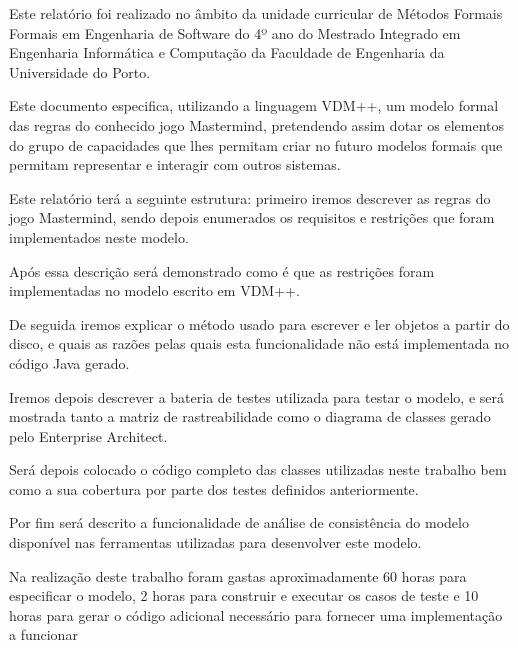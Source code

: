 Este relatório foi realizado no âmbito da unidade curricular de
Métodos Formais Formais em Engenharia de Software do 4º ano do
Mestrado Integrado em Engenharia Informática e Computação da Faculdade
de Engenharia da Universidade do Porto.

Este documento especifica, utilizando a linguagem VDM++, um modelo
formal das regras do conhecido jogo Mastermind, pretendendo assim
dotar os elementos do grupo de capacidades que lhes permitam criar no
futuro modelos formais que permitam representar e interagir com outros
sistemas.

Este relatório terá a seguinte estrutura: primeiro iremos descrever as
regras do jogo Mastermind, sendo depois enumerados os requisitos e
restrições que foram implementados neste modelo.

Após essa descrição será demonstrado como é que as restrições foram
implementadas no modelo escrito em VDM++.

De seguida iremos explicar o método usado para escrever e ler objetos
a partir do disco, e quais as razões pelas quais esta funcionalidade
não está implementada no código Java gerado.

Iremos depois descrever a bateria de testes utilizada para testar o
modelo, e será mostrada tanto a matriz de rastreabilidade como o
diagrama de classes gerado pelo Enterprise Architect.

Será depois colocado o código completo das classes utilizadas neste
trabalho bem como a sua cobertura por parte dos testes definidos
anteriormente.

Por fim será descrito a funcionalidade de análise de consistência do
modelo disponível nas ferramentas utilizadas para desenvolver este
modelo.

Na realização deste trabalho foram gastas aproximadamente 60 horas para especificar o
modelo, 2 horas para construir e executar os casos de teste e 10 horas
para gerar o código adicional necessário para fornecer uma
implementação a funcionar
